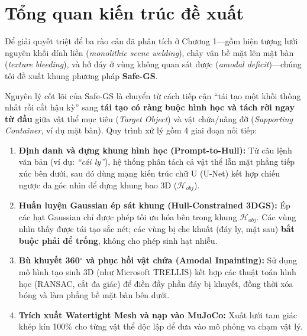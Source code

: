\section{Tổng quan kiến trúc đề xuất}
Để giải quyết triệt để ba rào cản đã phân tích ở Chương 1—gồm hiện tượng lưới nguyên khối dính liền (\textit{monolithic scene welding}), chảy vân bề mặt lên mặt bàn (\textit{texture bleeding}), và hở đáy ở vùng không quan sát được (\textit{amodal deficit})—chúng tôi đề xuất khung phương pháp \textbf{Safe-GS}.

Nguyên lý cốt lõi của Safe-GS là chuyển từ cách tiếp cận ``tái tạo một khối thống nhất rồi cắt hậu kỳ'' sang \textbf{tái tạo có ràng buộc hình học và tách rời ngay từ đầu} giữa vật thể mục tiêu (\textit{Target Object}) và vật chứa/nâng đỡ (\textit{Supporting Container}, ví dụ mặt bàn). Quy trình xử lý gồm 4 giai đoạn nối tiếp:
\begin{enumerate}
    \item \textbf{Định danh và dựng khung hình học (Prompt-to-Hull):} Từ câu lệnh văn bản (ví dụ: \textit{``cái ly''}), hệ thống phân tách cả vật thể lẫn mặt phẳng tiếp xúc bên dưới, sau đó dùng mạng kiến trúc chữ U (U-Net) kết hợp chiếu ngược đa góc nhìn để dựng khung bao 3D ($\mathcal{H}_{obj}$).
    \item \textbf{Huấn luyện Gaussian ép sát khung (Hull-Constrained 3DGS):} Ép các hạt Gaussian chỉ được phép tối ưu hóa bên trong khung $\mathcal{H}_{obj}$. Các vùng nhìn thấy được tái tạo sắc nét; các vùng bị che khuất (đáy ly, mặt sau) \textbf{bắt buộc phải để trống}, không cho phép sinh hạt nhiễu.
    \item \textbf{Bù khuyết 360$^\circ$ và phục hồi vật chứa (Amodal Inpainting):} Sử dụng mô hình tạo sinh 3D (như Microsoft TRELLIS) kết hợp các thuật toán hình học (RANSAC, cắt đa giác) để điền đầy phần đáy bị khuyết, đồng thời xóa bóng và làm phẳng bề mặt bàn bên dưới.
    \item \textbf{Trích xuất Watertight Mesh và nạp vào MuJoCo:} Xuất lưới tam giác khép kín 100\% cho từng vật thể độc lập để đưa vào mô phỏng va chạm vật lý.
\end{enumerate}
